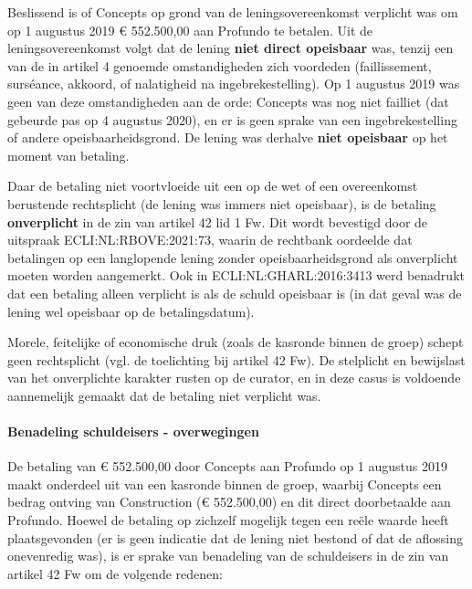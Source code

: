 \documentclass[
  dutch,
  a4paper,
]{article}
\begin{document}
Beslissend is of Concepts op grond van de leningsovereenkomst verplicht was om op 1 augustus 2019 € 552.500,00 aan Profundo te betalen. Uit de leningsovereenkomst volgt dat de lening \textbf{niet direct opeisbaar} was, tenzij een van de in artikel 4 genoemde omstandigheden zich voordeden (faillissement, surséance, akkoord, of nalatigheid na ingebrekestelling). Op 1 augustus 2019 was geen van deze omstandigheden aan de orde: Concepts was nog niet failliet (dat gebeurde pas op 4 augustus 2020), en er is geen sprake van een ingebrekestelling of andere opeisbaarheidsgrond. De lening was derhalve \textbf{niet opeisbaar} op het moment van betaling.

Daar de betaling niet voortvloeide uit een op de wet of een overeenkomst berustende rechtsplicht (de lening was immers niet opeisbaar), is de betaling \textbf{onverplicht} in de zin van artikel 42 lid 1 Fw. Dit wordt bevestigd door de uitspraak ECLI:NL:RBOVE:2021:73, waarin de rechtbank oordeelde dat betalingen op een langlopende lening zonder opeisbaarheidsgrond als onverplicht moeten worden aangemerkt. Ook in ECLI:NL:GHARL:2016:3413 werd benadrukt dat een betaling alleen verplicht is als de schuld opeisbaar is (in dat geval was de lening wel opeisbaar op de betalingsdatum).

Morele, feitelijke of economische druk (zoals de kasronde binnen de groep) schept geen rechtsplicht (vgl. de toelichting bij artikel 42 Fw). De stelplicht en bewijslast van het onverplichte karakter rusten op de curator, en in deze casus is voldoende aannemelijk gemaakt dat de betaling niet verplicht was.

\paragraph{Benadeling schuldeisers - overwegingen}\label{benadeling-schuldeisers---overwegingen-39}

De betaling van € 552.500,00 door Concepts aan Profundo op 1 augustus 2019 maakt onderdeel uit van een kasronde binnen de groep, waarbij Concepts een bedrag ontving van Construction (€ 552.500,00) en dit direct doorbetaalde aan Profundo. Hoewel de betaling op zichzelf mogelijk tegen een reële waarde heeft plaatsgevonden (er is geen indicatie dat de lening niet bestond of dat de aflossing onevenredig was), is er sprake van benadeling van de schuldeisers in de zin van artikel 42 Fw om de volgende redenen:
\end{document}
